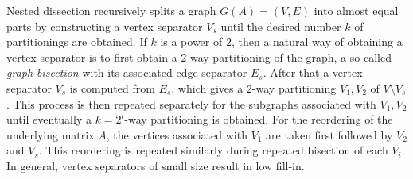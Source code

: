 Nested dissection recursively splits a graph $G(A)= (V,E)$ into almost
equal parts by constructing a vertex separator $V_s$ 
until the desired number $k$ 
of partitionings are obtained. If $k$ is a power of $2$, then a natural
way of obtaining a vertex separator
is to first obtain a $2$-way partitioning of the graph, a so called
\emph{graph bisection} with its associated edge separator $E_s$.
After that a vertex separator $V_s$ is computed from $E_s$, which
gives a $2$-way partitioning $V_1,V_2$ of $V\setminus V_s$.
This process is then repeated separately
for the subgraphs associated with $V_1,V_2$ until eventually a
$k=2^l$-way partitioning is obtained. For the reordering of the
underlying matrix $A$, the vertices associated with $V_1$ are taken first
followed by $V_2$ and $V_s$. This reordering is repeated similarly during
repeated bisection of each $V_i$. In general, vertex separators
of small size result in low fill-in.

